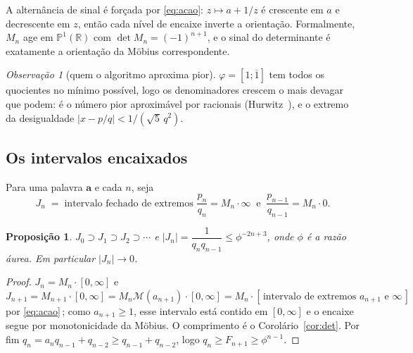 \documentclass[11pt,a4paper]{article}
\theoremstyle{plain}
\newtheorem{proposicao}[teorema]{Proposição}
\theoremstyle{definition}
\theoremstyle{remark}
\newtheorem{obs}[teorema]{Observação}
\newcommand{\R}{\mathbb{R}}
\newcommand{\Pj}{\mathbb{P}^1}
\newcommand{\Mat}[1]{\mathcal{M}(#1)}
\newcommand{\cf}[2]{[#1;#2]}
\begin{document}
A alternância de sinal é forçada por \eqref{eq:acao}: $z\mapsto a+1/z$ é crescente em $a$ e
decrescente em $z$, então cada nível de encaixe inverte a orientação. Formalmente, $M_n$ age em
$\Pj(\R)$ com $\det M_n = (-1)^{n+1}$, e o sinal do determinante é exatamente a orientação da
Möbius correspondente.

\begin{obs}[quem o algoritmo aproxima pior]\label{obs:hurwitz}
$\varphi = \cf{1}{\overline{1}}$ tem todos os quocientes no mínimo possível, logo os denominadores
crescem o mais devagar que podem: é o número pior aproximável por racionais (Hurwitz~\cite{hurwitz1891}),
e o extremo da desigualdade $|x-p/q| < 1/(\sqrt5\,q^2)$.
\end{obs}

\subsection{Os intervalos encaixados}

Para uma palavra $\mathbf a$ e cada $n$, seja
\[
  J_n \;=\; \text{intervalo fechado de extremos } \frac{p_n}{q_n} = M_n\cdot\infty
  \ \text{ e } \ \frac{p_{n-1}}{q_{n-1}} = M_n\cdot 0 .
\]

\begin{proposicao}\label{prop:encaixe}
$J_0 \supset J_1 \supset J_2 \supset \cdots$ e $|J_n| = \dfrac{1}{q_nq_{n-1}} \leq \phi^{-2n+3}$,
onde $\phi$ é a razão áurea. Em particular $|J_n|\to 0$.
\end{proposicao}

\begin{proof}
$J_n = M_n\cdot[0,\infty]$ e $J_{n+1} = M_{n+1}\cdot[0,\infty] = M_n\Mat{a_{n+1}}\cdot[0,\infty]
= M_n\cdot[\,\text{intervalo de extremos } a_{n+1} \text{ e } \infty\,]$ por \eqref{eq:acao}$\,$;
como $a_{n+1}\geq 1$, esse intervalo está contido em $[0,\infty]$ e o encaixe segue por
monotonicidade da Möbius. O comprimento é o Corolário~\ref{cor:det}. Por fim
$q_n = a_nq_{n-1}+q_{n-2} \geq q_{n-1}+q_{n-2}$, logo $q_n \geq F_{n+1} \geq \phi^{n-1}$.
\end{proof}

\begin{center}
\end{center}
\end{document}
